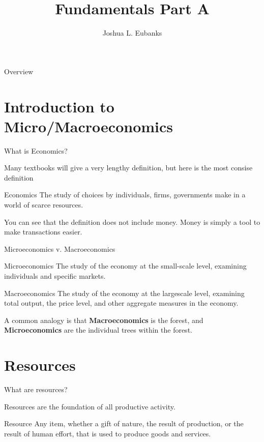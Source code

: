 \documentclass{beamer}
\title[Fundamentals]{Fundamentals Part A}
\author{Joshua L. Eubanks}
\date{\vspace{-8cm}}
\begin{document}
\begin{frame}
  \titlepage
\end{frame}

\begin{frame}{Overview}
\tableofcontents
\end{frame}

\section{Introduction to Micro/Macroeconomics}

\begin{frame}{What is Economics?}

Many textbooks will give a very lengthy definition, but here is the most consise definition

\begin{block}{Economics}
The study of choices by individuals, firms, governments make in a world of scarce resources.
\end{block}

You can see that the definition does not include money. Money is simply a tool to make transactions easier.

\end{frame}

\begin{frame}{Microeconomics v. Macroeconomics} 

  \begin{block}{Microeconomics}
The study of the economy at the small-scale level, examining individuals and specific markets.
  \end{block}

  \begin{block}{Macroeconomics}
The study of the economy at the largescale level, examining total output, the price level, and other aggregate measures in the economy.
  \end{block}

A common analogy is that \textbf{Macroeconomics} is the forest, and \textbf{Microeconomics} are the individual trees within the forest. 

\end{frame}

\section{Resources}


\begin{frame}{What are resources?}

Resources are the foundation of all productive activity.

\begin{block}{Resource}
Any item, whether a gift of nature, the result of production, or the result of human effort, that is used to produce goods and services.
\end{block}

\end{frame}
\end{document}
